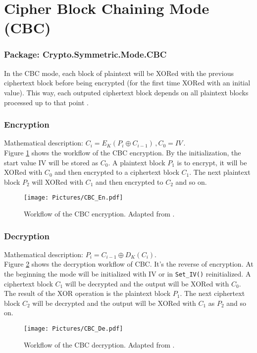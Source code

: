 \section{Cipher Block Chaining Mode (CBC)}
\subsubsection*{Package: Crypto.Symmetric.Mode.CBC}
In the CBC mode, each block of plaintext will be XORed with the previous ciphertext block before being encrypted (for the first time XORed with an initial value). This way, each outputed ciphertext block depends on all plaintext blocks processed up to that point \cite{DBLP:reference/crypt/2011}. 
\subsubsection*{Encryption}
Mathematical description: $C_i=E_K(P_i\oplus C_{i-1})\,, C_0=IV$\,.\\
Figure \ref{CBCEN} shows the workflow of the CBC encryption.
By the initialization, the start value IV will be stored as $C_0$. A plaintext block $P_1$ is to encrypt, it will be XORed with $C_0$ and then encrypted to a ciphertext block $C_1$. The next plaintext block $P_2$ will XORed with $C_1$ and then encrypted to $C_2$ and so on.
\begin{figure}[h]
\centering
\texttt{[image: Pictures/CBC\_En.pdf]}  
\caption{Workflow of the CBC encryption. Adapted from \cite{DBLP:reference/crypt/2011}.}\label{CBCEN}
\end{figure}
\subsubsection*{Decryption}
Mathematical description: $P_i=C_{i-1}\oplus D_K(C_i)$.\\
Figure \ref{CBCDE} shows the decryption workflow of CBC. It's the reverse of encryption. At the beginning the mode will be initialized with IV or in \texttt{Set\_IV()} reinitialized. A ciphertext block $C_1$ will be decrypted and the output will be XORed with $C_0$. The result of the XOR operation is the plaintext block $P_1$. The next ciphertext block $C_2$ will be decrypted and the output will be XORed with $C_1$ as $P_2$ and so on. 
\begin{figure}[h]
\centering
\texttt{[image: Pictures/CBC\_De.pdf]} 
\caption{Workflow of the CBC decryption. Adapted from \cite{DBLP:reference/crypt/2011}.}\label{CBCDE}
\end{figure}
